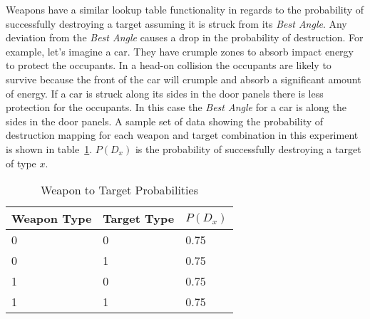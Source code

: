 
Weapons have a similar lookup table functionality in regards to the probability of successfully destroying a target assuming it is struck from its \textit{Best Angle}.  Any deviation from the \textit{Best Angle} causes a drop in the probability of destruction.  For example, let's imagine a car.  They have crumple zones to absorb impact energy to protect the occupants.  In a head-on collision the occupants are likely to survive because the front of the car will crumple and absorb a significant amount of energy.  If a car is struck along its sides in the door panels there is less protection for the occupants.  In this case the \textit{Best Angle} for a car is along the sides in the door panels. A sample set of data showing the probability of destruction mapping for each weapon and target combination in this experiment is shown in table~\ref{tab:wpnTgtProb}.  $P(D_{x})$ is the probability of successfully destroying a target of type $x$.

\begin{table}[H]
	\caption{Weapon to Target Probabilities}
	\centering
	\label{tab:wpnTgtProb}
	\begin{tabular}{|p{1.5cm}|p{1.5cm}|p{3cm}|}
		\hline
		Weapon Type & Target Type & $P(D_{x})$\\ \hline
		0 & 0 & 0.75 \\
		0 & 1 & 0.75 \\
		1 & 0 & 0.75 \\
		1 & 1 & 0.75 \\
		\hline
	\end{tabular}
\end{table}



